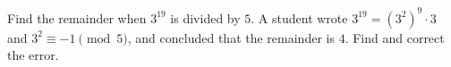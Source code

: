 Find the remainder when $3^{19}$ is divided by $5$. A student wrote $3^{19}=\left(3^2\right)^9\cdot3$ and $3^2\equiv-1\pmod5$, and concluded that the remainder is $4$. Find and correct the error.
